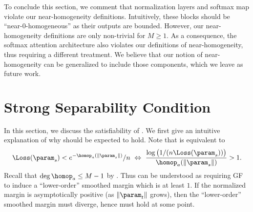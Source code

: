 To conclude this section, we comment that  normalization layers and softmax map violate our near-homogeneity definitions. Intuitively, these blocks should be ``near-$0$-homogeneous'' as their outputs are bounded. However, our near-homogeneity definitions are only non-trivial for $M\ge 1$. 
As a consequence, the softmax attention architecture also violates our definitions of near-homogeneity, thus requiring a different treatment.
We believe that our notion of near-homogeneity can be generalized to include those components, which we leave as future work.




\section{Strong Separability Condition} \label{sec:example}

In this section, we discuss the satisfiability of . 
We first give an intuitive explanation of why  should be expected to hold.
Note that  is equivalent to 
\[
\Loss(\param_s) < e^{-\homop_a(\|\param_s\|)}/n\ \Leftrightarrow \ 
\frac{\log\big(1/(n\Loss(\param_s))\big)}{\homop_a(\|\param_s\|)} > 1.
\]
Recall that $\deg \homop_a \le M-1$ by . Thus  can be understood as requiring GF to induce a ``lower-order'' smoothed margin which is at least $1$.
If the normalized margin \Cref{eq: normalized margin} is asymptotically positive (as $\|\param_t\|$ grows), then the ``lower-order'' smoothed margin 
must diverge, hence  must hold at some point. 


